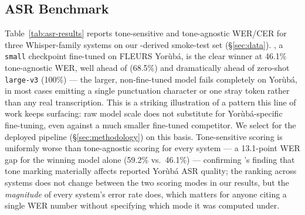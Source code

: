 \subsection{ASR Benchmark}


Table~\ref{tab:asr-results} reports tone-sensitive and tone-agnostic WER/CER
for three Whisper-family systems on our \citet{shunyalabs-yoruba}-derived
smoke-test set (\S\ref{sec:data}). \citet{whisper-small-yoruba}, a
\citet{whisper} \texttt{small} checkpoint fine-tuned on FLEURS Yor\`ub\'a,
is the clear winner at 46.1\% tone-agnostic WER, well ahead of
\citet{whisper-base-yoruba-colab} (68.5\%) and dramatically ahead of
zero-shot \texttt{large-v3} (100\%) --- the larger, non-fine-tuned model
fails completely on Yor\`ub\'a, in most cases emitting a single punctuation
character or one stray token rather than any real transcription. This is a
striking illustration of a pattern this line of work keeps surfacing: raw
model scale does not substitute for Yor\`ub\'a-specific fine-tuning, even
against a much smaller fine-tuned competitor. We select
\citet{whisper-small-yoruba} for the deployed pipeline (\S\ref{sec:methodology})
on this basis. Tone-sensitive scoring is uniformly worse than tone-agnostic
scoring for every system --- a 13.1-point WER gap for the winning model
alone (59.2\% vs.\ 46.1\%) --- confirming \citet{tone-yoruba-asr}'s finding
that tone marking materially affects reported Yor\`ub\'a ASR quality; the
ranking across systems does not change between the two scoring modes in
our results, but the \emph{magnitude} of every system's error rate does,
which matters for anyone citing a single WER number without specifying
which mode it was computed under.

